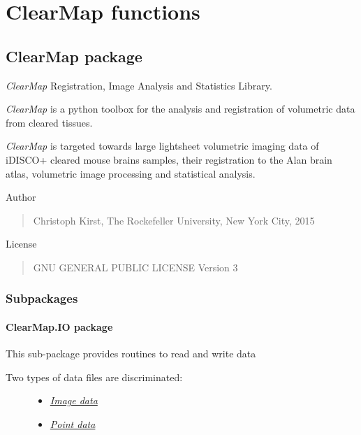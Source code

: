 \documentclass[letterpaper,10pt,english]{sphinxmanual}
\begin{document}
\chapter{ClearMap functions}
\label{index:clearmap-functions}

\section{ClearMap package}
\label{api/ClearMap:clearmap-package}\label{api/ClearMap::doc}\label{api/ClearMap:module-ClearMap}
\emph{ClearMap} Registration, Image Analysis and Statistics Library.

\emph{ClearMap} is a python toolbox for the analysis and registration of volumetric
data from cleared tissues.

\emph{ClearMap} is targeted towards large lightsheet volumetric imaging data
of iDISCO+ cleared mouse brains samples, their registration to the Alan brain atlas,
volumetric image processing and statistical analysis.

Author
\begin{quote}

Christoph Kirst,
The Rockefeller University, New York City, 2015
\end{quote}

License
\begin{quote}

GNU GENERAL PUBLIC LICENSE Version 3
\end{quote}


\subsection{Subpackages}
\label{api/ClearMap:subpackages}

\subsubsection{ClearMap.IO package}
\label{api/ClearMap.IO:clearmap-io-package}\label{api/ClearMap.IO::doc}\label{api/ClearMap.IO:module-ClearMap.IO}
This sub-package provides routines to read and write data
\begin{description}
\item[{Two types of data files are discriminated:}] \leavevmode\begin{itemize}
\item {} 
{\hyperref[api/ClearMap.IO:image-data]{\emph{Image data}}}

\item {} 
{\hyperref[api/ClearMap.IO:point-data]{\emph{Point data}}}

\end{itemize}

\end{description}
\end{document}
